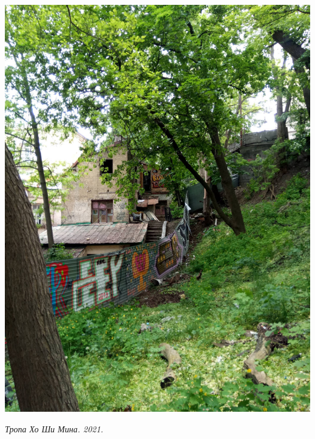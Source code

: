 \begin{center}
\includegraphics[width=\linewidth]{rpix/IMG_20210601_135258.jpg}

\textit{Тропа Хо Ши Мина. 2021.}
\end{center}

\vspace*{\fill}

\newpage







